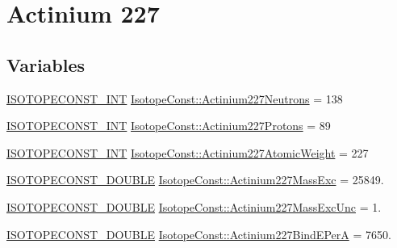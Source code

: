 \hypertarget{group___isotope_const-_actinium-_ac227}{}\section{Actinium 227}
\label{group___isotope_const-_actinium-_ac227}
\subsection*{Variables}
\begin{DoxyCompactItemize}
\item 
\mbox{\hyperlink{group___isotope_const-_macros_ga5f18360b3e99483a35c32d789e62621c}{I\+S\+O\+T\+O\+P\+E\+C\+O\+N\+S\+T\+\_\+\+I\+NT}} \mbox{\hyperlink{group___isotope_const-_actinium-_ac227_ga2bb9df4f248daabb3c4053518c4b0d1a}{Isotope\+Const\+::\+Actinium227\+Neutrons}} = 138
\item 
\mbox{\hyperlink{group___isotope_const-_macros_ga5f18360b3e99483a35c32d789e62621c}{I\+S\+O\+T\+O\+P\+E\+C\+O\+N\+S\+T\+\_\+\+I\+NT}} \mbox{\hyperlink{group___isotope_const-_actinium-_ac227_ga3ef161adf5eb151629abe590f913a2d3}{Isotope\+Const\+::\+Actinium227\+Protons}} = 89
\item 
\mbox{\hyperlink{group___isotope_const-_macros_ga5f18360b3e99483a35c32d789e62621c}{I\+S\+O\+T\+O\+P\+E\+C\+O\+N\+S\+T\+\_\+\+I\+NT}} \mbox{\hyperlink{group___isotope_const-_actinium-_ac227_ga7376950fef8a92b7343d820d082c81cd}{Isotope\+Const\+::\+Actinium227\+Atomic\+Weight}} = 227
\item 
\mbox{\hyperlink{group___isotope_const-_macros_ga8f45a7272ce02c0b4c65c44636ed719a}{I\+S\+O\+T\+O\+P\+E\+C\+O\+N\+S\+T\+\_\+\+D\+O\+U\+B\+LE}} \mbox{\hyperlink{group___isotope_const-_actinium-_ac227_gac5035d1ce094f3500239d68df50db0bd}{Isotope\+Const\+::\+Actinium227\+Mass\+Exc}} = 25849.
\item 
\mbox{\hyperlink{group___isotope_const-_macros_ga8f45a7272ce02c0b4c65c44636ed719a}{I\+S\+O\+T\+O\+P\+E\+C\+O\+N\+S\+T\+\_\+\+D\+O\+U\+B\+LE}} \mbox{\hyperlink{group___isotope_const-_actinium-_ac227_gaf6ee6c32840d1f3f2311e26aef7c1baa}{Isotope\+Const\+::\+Actinium227\+Mass\+Exc\+Unc}} = 1.
\item 
\mbox{\hyperlink{group___isotope_const-_macros_ga8f45a7272ce02c0b4c65c44636ed719a}{I\+S\+O\+T\+O\+P\+E\+C\+O\+N\+S\+T\+\_\+\+D\+O\+U\+B\+LE}} \mbox{\hyperlink{group___isotope_const-_actinium-_ac227_gaacd574246c649592bf24781688283701}{Isotope\+Const\+::\+Actinium227\+Bind\+E\+PerA}} = 7650.
\item 

\end{DoxyCompactItemize}
